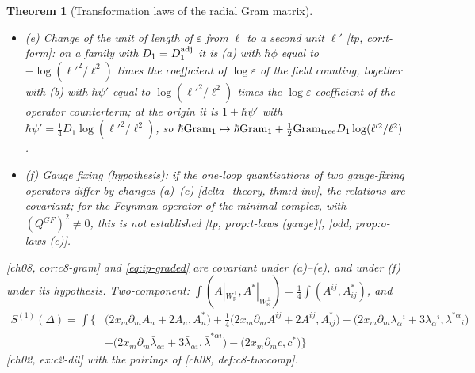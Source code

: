 \documentclass[11pt]{report}
\theoremstyle{plain}
\newtheorem{theorem}{Theorem}[chapter]
\theoremstyle{definition}
\numberwithin{equation}{chapter}
\newcommand{\Wp}{W_{\mathbb R}^\perp}
\newcommand{\Gt}{\mathrm{Gram}_{\rm tree}}
\newcommand{\Go}{\mathrm{Gram}_{1}}
\begin{document}
\begin{theorem}[Transformation laws of the radial Gram matrix]
\begin{itemize}
\item (e) Change of the unit of length of $\varepsilon$ from $\ell$ to a second unit $\ell'$ [tp, cor:t-form]: on a family with $D_1=D_1^{\rm adj}$ it is (a) with $\hbar\phi$ equal to $-\log(\ell'^2/\ell^2)$ times the coefficient of $\log\varepsilon$ of the field counting, together with (b) with $\hbar\psi'$ equal to $\log(\ell'^2/\ell^2)$ times the $\log\varepsilon$ coefficient of the operator counterterm; at the origin it is $1+\hbar\psi'$ with $\hbar\psi'=\tfrac14D_1\log(\ell'^2/\ell^2)$, so $\hbar\Go\mapsto\hbar\Go+\tfrac12\Gt D_1\log(\ell'^2/\ell^2)$.
\item (f) Gauge fixing (hypothesis): if the one-loop quantisations of two gauge-fixing operators differ by changes (a)--(c) [delta\_theory, thm:d-inv], the relations are covariant; for the Feynman operator of the minimal complex, with $(Q^{GF})^2\neq0$, this is not established [tp, prop:t-laws (gauge)], [odd, prop:o-laws (c)].
\end{itemize}
[ch08, cor:c8-gram] and \eqref{eq:ip-graded} are covariant under (a)--(e), and under (f) under its hypothesis. Two-component: $\int(A|_{\Wp},A^*|_{\Wp})=\tfrac14\int(A^{ij},A^*_{ij})$, and
\[
\begin{aligned}
S^{(1)}(\Delta)=\int\Big\{&\big(2x_m\partial_mA_n+2A_n,A^*_n\big)+\tfrac14\big(2x_m\partial_mA^{ij}+2A^{ij},A^*_{ij}\big)-\big(2x_m\partial_m\lambda_\alpha{}^i+3\lambda_\alpha{}^i,\lambda^{*\alpha}{}_i\big)\\
&+\big(2x_m\partial_m\bar\lambda_{\dot\alpha i}+3\bar\lambda_{\dot\alpha i},\bar\lambda^{*\dot\alpha i}\big)-\big(2x_m\partial_mc,c^*\big)\Big\}
\end{aligned}
\]
[ch02, ex:c2-dil] with the pairings of [ch08, def:c8-twocomp].
\end{theorem}
\end{document}
